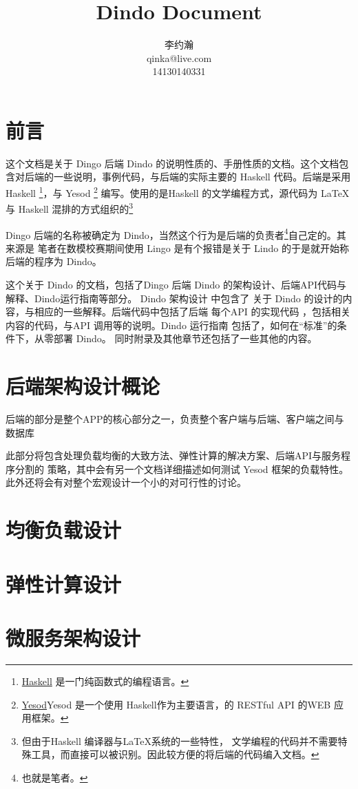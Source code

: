 \documentclass{dingo}
\title{Dindo Document}
\author{李约瀚\\qinka@live.com\\14130140331}
\begin{document}
	\makecover
    \section*{前言}
    这个文档是关于 Dingo 后端 Dindo 的说明性质的、手册性质的文档。这个文档包含对后端的一些说明，事例代码，与后端的实际主要的 Haskell
    代码。后端是采用 Haskell \footnote{\href{https://www.haskell.org}{Haskell} 是一门纯函数式的编程语言。}，与 Yesod 
    \footnote{\href{http://www.yesodweb.com}{Yesod}Yesod 是一个使用 Haskell作为主要语言，的 RESTful API 的WEB 应用框架。}
    编写。使用的是Haskell 的文学编程方式，源代码为 \LaTeX 与 Haskell 混排的方式组织的\footnote{但由于Haskell 编译器与\LaTeX 系统的一些特性，
        文学编程的代码并不需要特殊工具，而直接可以被识别。因此较方便的将后端的代码编入文档。}
    
    Dingo 后端的名称被确定为 Dindo，当然这个行为是后端的负责者\footnote{也就是笔者。}自己定的。其来源是 笔者在数模校赛期间使用
    Lingo 是有个报错是关于 Lindo 的于是就开始称后端的程序为 Dindo。
    
    这个关于 Dindo 的文档，包括了Dingo 后端 Dindo 的架构设计、后端API代码与解释、Dindo运行指南等部分。
    Dindo 架构设计 中包含了 关于 Dindo 的设计的内容，与相应的一些解释。后端代码中包括了后端 每个API 的实现代码
    ，包括相关内容的代码，与API 调用等的说明。Dindo 运行指南 包括了，如何在“标准”的条件下，从零部署 Dindo。
    同时附录及其他章节还包括了一些其他的内容。
    \newpage
	\makecontent
    \section{后端架构设计概论}
    后端的部分是整个APP的核心部分之一，负责整个客户端与后端、客户端之间与数据库
    
    此部分将包含处理负载均衡的大致方法、弹性计算的解决方案、后端API与服务程序分割的
    策略，其中会有另一个文档详细描述如何测试 Yesod 框架的负载特性。
    此外还将会有对整个宏观设计一个小的对可行性的讨论。
    
    \section{均衡负载设计}
    \section{弹性计算设计}
    \section{微服务架构设计}
\end{document}
